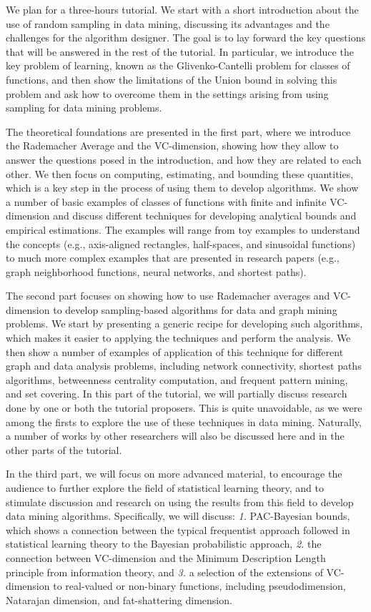\documentclass[11pt]{article}
\begin{document}
We plan for a three-hours tutorial. We start with a short introduction
about the use of random sampling in data mining, discussing its advantages and
the challenges for the algorithm designer. The goal is to lay forward the key
questions that will be answered in the rest of the tutorial. In particular, we
introduce the key problem of learning, known as the Glivenko-Cantelli problem
for classes of functions, and then show the limitations of the Union bound in
solving this problem and ask how to overcome them in the settings arising from
using sampling for data mining problems.

\medskip
The theoretical foundations are presented in the first part, where we introduce
the Rademacher Average and the VC-dimension, showing how they allow to answer
the questions posed in the introduction, and how they are related to each other.
We then focus on computing, estimating, and bounding these quantities, which is
a key step in the process of using them to develop algorithms. We show a number
of basic examples of classes of functions with finite and infinite VC-dimension
and discuss different techniques for developing analytical bounds and empirical
estimations. The examples will range from toy examples to understand the
concepts (e.g., axis-aligned rectangles, half-spaces, and sinusoidal functions)
to much more complex examples that are presented in research papers (e.g.,
graph neighborhood functions, neural networks, and shortest paths).

\medskip
The second part focuses on showing how to use Rademacher averages and
VC-dimension to develop sampling-based algorithms for data and graph mining
problems. We start by presenting a generic recipe for developing such
algorithms, which makes it easier to applying the techniques and perform the
analysis. We then show a number of examples of application of this technique for
different graph and data analysis problems, including network connectivity,
shortest paths algorithms, betweenness centrality computation, and frequent
pattern mining, and set covering. In this part of the tutorial, we will
partially discuss research done by one or both the tutorial proposers. This is
quite unavoidable, as we were among the firsts to explore the use of these
techniques in data mining.  Naturally, a number of works by other researchers
will also be discussed here and in the other parts of the tutorial.

\medskip
In the third part, we will focus on more advanced material, to encourage the
audience to further explore the field of statistical learning theory, and to
stimulate discussion and research on using the results from this field to
develop data mining algorithms. Specifically, we will discuss: {\em 1.} PAC-Bayesian bounds, which shows a connection between the typical frequentist
approach followed in statistical learning theory to the Bayesian probabilistic
approach, {\em 2.} the connection between VC-dimension and the Minimum
Description Length principle from information theory, and {\em 3.} a selection
of the extensions of VC-dimension to real-valued or non-binary functions,
including pseudodimension, Natarajan dimension, and fat-shattering dimension.
\end{document}
